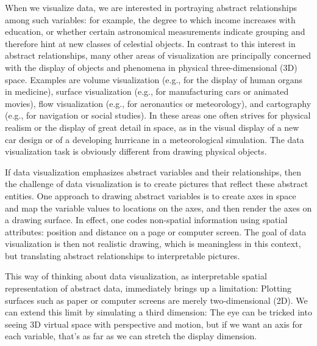  
 
 
 
When we visualize data, we are interested in portraying abstract
relationships among such variables: for example, the degree to which
income increases with education, or whether certain astronomical
measurements indicate grouping and therefore hint at new classes of
celestial objects.  In contrast to this interest in abstract
relationships, many other areas of visualization are principally
concerned with the display of objects and phenomena in physical
three-dimensional (3D) space.  Examples are volume visualization
(e.g., for the display of human organs in medicine), surface
visualization (e.g., for manufacturing cars or animated movies), flow
visualization (e.g., for aeronautics or meteorology), and cartography
(e.g., for navigation or social studies).  In these areas one often
strives for physical realism or the display of great detail in space,
as in the visual display of a new car design or of a developing
hurricane in a meteorological simulation. The data visualization task
is obviously different from drawing physical objects.

If data visualization emphasizes abstract variables and their
relationships, then the challenge of data visualization is to create
pictures that reflect these abstract entities.  One approach to
drawing abstract variables is to create axes in space and map the
variable values to locations on the axes, and then render the axes on
a drawing surface.  In effect, one codes non-spatial information using
spatial attributes: position and distance on a page or computer
screen.  The goal of data visualization is then not realistic drawing,
which is meaningless in this context, but translating abstract
relationships to interpretable pictures.

This way of thinking about data visualization, as interpretable
spatial representation of abstract data, immediately brings up a
limitation:  Plotting surfaces such as paper or computer screens are
merely two-dimensional (2D).  We can extend this limit by simulating a third
dimension: The eye can be tricked into seeing 3D virtual
space with perspective and motion, but if we want an axis for each
variable, that's as far as we can stretch the display dimension.

